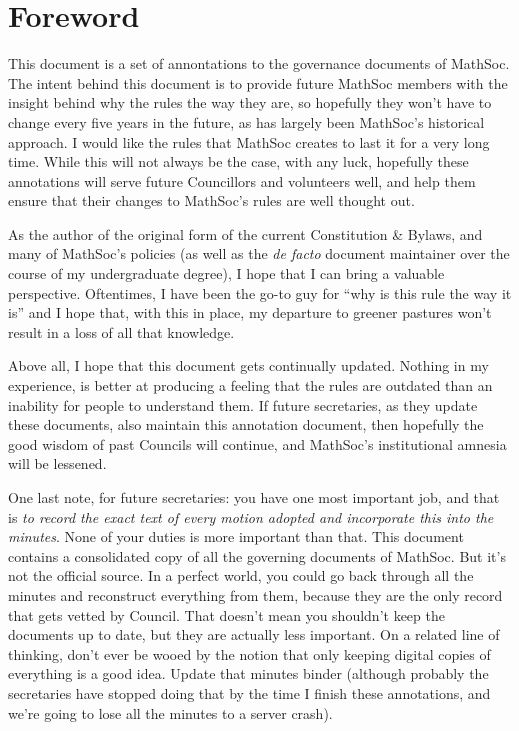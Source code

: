 \section*{Foreword}

This document is a set of annontations to the governance documents of MathSoc.
The intent behind this document is to provide future MathSoc members with the
insight behind why the rules the way they are, so hopefully they won't have to
change every five years in the future, as has largely been MathSoc's historical
approach. I would like the rules that MathSoc creates to last it for a very long
time. While this will not always be the case, with any luck, hopefully these
annotations will serve future Councillors and volunteers well, and help them
ensure that their changes to MathSoc's rules are well thought out.

As the author of the original form of the current Constitution \& Bylaws, and
many of MathSoc's policies (as well as the \emph{de facto} document maintainer
over the course of my undergraduate degree), I hope that I can bring a valuable
perspective. Oftentimes, I have been the go-to guy for ``why is this rule the way
it is'' and I hope that, with this in place, my departure to greener pastures
won't result in a loss of all that knowledge.

Above all, I hope that this document gets continually updated. Nothing in my
experience, is better at producing a feeling that the rules are outdated than an
inability for people to understand them. If future secretaries, as they update
these documents, also maintain this annotation document, then hopefully the good
wisdom of past Councils will continue, and MathSoc's institutional amnesia will
be lessened.

One last note, for future secretaries: you have one most important job, and that
is \emph{to record the exact text of every motion adopted and incorporate this
into the minutes}. None of your duties is more important than that. This
document contains a consolidated copy of all the governing documents of MathSoc.
But it's not the official source. In a perfect world, you could go back through
all the minutes and reconstruct everything from them, because they are the only
record that gets vetted by Council. That doesn't mean you shouldn't keep the
documents up to date, but they are actually less important. On a related line of
thinking, don't ever be wooed by the notion that only keeping digital copies of
everything is a good idea. Update that minutes binder (although probably the
secretaries have stopped doing that by the time I finish these annotations, and
we're going to lose all the minutes to a server crash).

